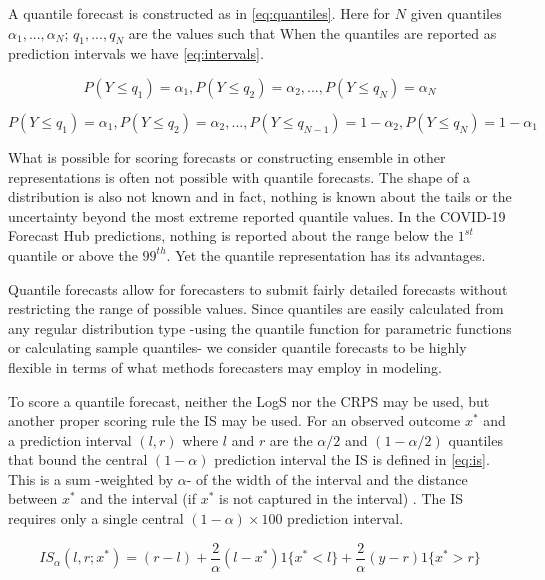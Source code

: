 \documentclass[11pt,notitlepage]{isuthesis}
\begin{document}
A quantile forecast is constructed as in \eqref{eq:quantiles}.
Here for $N$ given quantiles $\alpha_1,..., \alpha_N$; $q_1,..., q_N$ are the 
values such that 
When the quantiles are reported as prediction intervals we have 
\eqref{eq:intervals}.

\begin{equation}
\label{eq:quantiles}
  P(Y \leq q_1) = \alpha_1, P(Y \leq q_2) = \alpha_2, ..., 
  P(Y \leq q_N) = \alpha_N
\end{equation}


\begin{equation}
\label{eq:intervals}
  P(Y \leq q_1) = \alpha_1, P(Y \leq q_2) = \alpha_2, ...,
  P(Y \leq q_{N-1}) = 1 - \alpha_2, P(Y \leq q_N) = 1 - \alpha_1
\end{equation}

What is possible for scoring forecasts
or constructing ensemble in other representations is often not possible with
quantile forecasts. The shape of a distribution is also not known and in fact,
nothing is known about the tails or the uncertainty beyond the most 
extreme reported quantile values. In the COVID-19 Forecast Hub predictions, 
nothing 
is reported about the range below the $1^{st}$ quantile or above the $99^{th}$.
Yet the quantile representation has its advantages. 

Quantile forecasts allow for forecasters to submit fairly detailed
forecasts without restricting the range of possible values.
Since quantiles are easily calculated from any regular distribution type
-using the quantile function for parametric functions or calculating sample 
quantiles- we consider quantile forecasts to be highly flexible in terms of 
what methods forecasters may employ in modeling.

To score a quantile forecast, 
neither the LogS nor the CRPS may be used, 
but another proper scoring rule the IS may be used.
For an observed outcome $x^*$ and a prediction interval $(l,r)$ 
where $l$ and $r$ are the $\alpha/2$ and $(1-\alpha/2)$ quantiles that bound
the central $(1-\alpha)$ prediction interval the IS is defined in \eqref{eq:is}.
This is a sum -weighted by 
$\alpha$- of the width of the
interval and the distance between $x^*$ and the interval (if $x^*$ is not 
captured in the interval) \cite[]{gneiting2014probabilistic}. 
The IS requires only a single central 
$(1-\alpha) \times 100$ prediction interval.

\begin{equation}
\label{eq:is}
  IS_{\alpha}(l,r; x^*) = (r-l) + \frac{2}{\alpha}(l-x^*)1\{x^*<l\} 
  + \frac{2}{\alpha}(y-r)1\{x^* > r\}
\end{equation}
\end{document}
